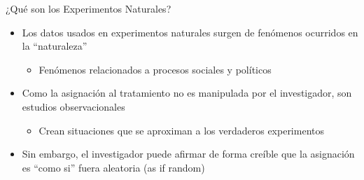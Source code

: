 \documentclass[
  ignorenonframetext,
]{beamer}
\providecommand{\tightlist}{%
  \setlength{\itemsep}{0pt}\setlength{\parskip}{0pt}}
\begin{document}
\begin{frame}{¿Qué son los Experimentos Naturales?}
\protect\hypertarget{quuxe9-son-los-experimentos-naturales}{}
\begin{itemize}
\tightlist
\item
  Los datos usados en experimentos naturales surgen de fenómenos
  ocurridos en la ``naturaleza''

  \begin{itemize}
  \tightlist
  \item
    Fenómenos relacionados a procesos sociales y políticos
  \end{itemize}
\item
  Como la asignación al tratamiento no es manipulada por el
  investigador, son estudios observacionales

  \begin{itemize}
  \tightlist
  \item
    Crean situaciones que se aproximan a los verdaderos experimentos
  \end{itemize}
\item
  Sin embargo, el investigador puede afirmar de forma creíble que la
  asignación es ``como si'' fuera aleatoria (as if random)
\end{itemize}
\end{frame}
\end{document}
